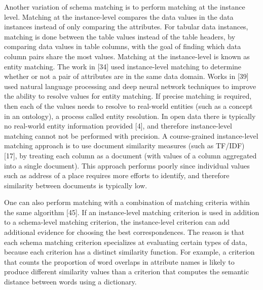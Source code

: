 Another variation of schema matching is to perform matching at the instance level. Matching at the instance-level compares the data values in the data instances instead of only comparing the attributes. For tabular data instances, matching is done between the table values instead of the table headers, by comparing data values in table columns, with the goal of finding which data column pairs share the most values. Matching at the instance-level is known as entity matching. The work in \cite{Mudgal2018Deep}[34] used instance-level matching to determine whether or not a pair of attributes are in the same data domain. Works in \cite{Rahm2016Case}[39] used natural language processing and deep neural network techniques to improve the ability to resolve values for entity matching. If precise matching is required, then each of the values needs to resolve to real-world entities (such as a concept in an ontology), a process called entity resolution. In open data there is typically no real-world entity information provided \cite{books/sp/bellahsene11}[4], and therefore instance-level matching cannot not be performed with precision. A course-grained instance-level matching approach is to use document similarity measures (such as TF/IDF) \cite{Duchateau2009YAM}[17], by treating each column as a document (with values of a column aggregated into a single document). This approach performs poorly since individual values such as address of a place requires more efforts to identify, and therefore similarity between documents is typically low. 

One can also perform matching with a combination of matching criteria within the same algorithm \cite{Sorrentino2011NORMS}[45]. If an instance-level matching criterion is used in addition to a schema-level matching criterion, the instance-level criterion can add additional evidence for choosing the best correspondences. The reason is that each schema matching criterion specializes at evaluating certain types of data, because each criterion has a distinct similarity function. For example, a criterion that counts the proportion of word overlaps in attribute names is likely to produce different similarity values than a criterion that computes the semantic distance between words using a dictionary.

